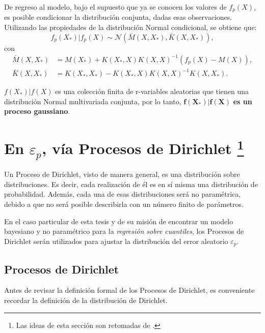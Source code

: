 De regreso al modelo, bajo el supuesto que ya se conocen los valores de $f_p(X)$, es posible condicionar la distribución conjunta, dadas esas observaciones. Utilizando las propiedades de la distribución Normal condicional, se obtiene que:
\begin{equation*}
    f_p(X_*)|f_p(X) 
    \sim \mathcal{N}
    (\bar{M}(X,X_*),\bar{K}(X,X_*)),
\end{equation*}
con
\begin{equation*}
\begin{aligned}
    \bar{M}(X,X_*) &= M(X_*) + K(X_*,X)K(X,X)^{-1}(f_p(X) - M(X)), \\
    \bar{K}(X,X_*) &= K(X_*,X_*) - K(X_*,X)K(X,X)^{-1}K(X,X_*).
\end{aligned}
\end{equation*}

\begin{obs*}
    $f(X_*)|f(X)$ es una colección finita de r-variables aleatorias que tienen una distribuci\'on Normal multivariada conjunta, por lo tanto, $\bm{f(X_*)|f(X)}$ \textbf{es un proceso gaussiano}.
\end{obs*}

\section[En $\varepsilon_p$, v\'ia Procesos de Dirichlet]{
    En $\varepsilon_p$, v\'ia Procesos de Dirichlet
    \footnote{Las ideas de esta secci\'on son retomadas de \cite{Yee_DirProc}.}
}

Un Proceso de Dirichlet, visto de manera general, es una distribuci\'on sobre distribuciones. Es decir, cada realizaci\'on de él es en sí misma una distribuci\'on de probabilidad. Adem\'as, cada una de esas distribuciones ser\'a no param\'etrica, debido a que no ser\'a posible describirla con un n\'umero finito de par\'ametros.

En el caso particular de esta tesis y de su misi\'on de encontrar un modelo bayesiano y no param\'etrico para la \textit{regresi\'on sobre cuantiles}, los Procesos de Dirichlet ser\'an utilizados para ajustar la distribuci\'on del error aleatorio $\varepsilon_p$.

\subsection{Procesos de Dirichlet}

Antes de revisar la definici\'on formal de los Procesos de Dirichlet, es conveniente recordar la definici\'on de la distribuci\'on de Dirichlet.

